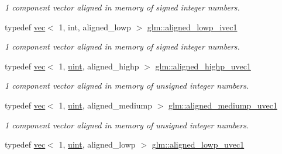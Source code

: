 \begin{DoxyCompactItemize}
\begin{DoxyCompactList}\small\item\em 1 component vector aligned in memory of signed integer numbers. \end{DoxyCompactList}\item 
\mbox{\label{group__gtc__type__aligned_gadf9e665b78c3aead513e9505fa31f9e2}} 
typedef \hyperlink{structglm_1_1vec}{vec}$<$ 1, int, aligned\+\_\+lowp $>$ \hyperlink{group__gtc__type__aligned_gadf9e665b78c3aead513e9505fa31f9e2}{glm\+::aligned\+\_\+lowp\+\_\+ivec1}
\begin{DoxyCompactList}\small\item\em 1 component vector aligned in memory of signed integer numbers. \end{DoxyCompactList}\item 
\mbox{\label{group__gtc__type__aligned_ga3ba8c6f6b81f57159b0536ce5d4339d0}} 
typedef \hyperlink{structglm_1_1vec}{vec}$<$ 1, \hyperlink{group__core__precision_ga4fd29415871152bfb5abd588334147c8}{uint}, aligned\+\_\+highp $>$ \hyperlink{group__gtc__type__aligned_ga3ba8c6f6b81f57159b0536ce5d4339d0}{glm\+::aligned\+\_\+highp\+\_\+uvec1}
\begin{DoxyCompactList}\small\item\em 1 component vector aligned in memory of unsigned integer numbers. \end{DoxyCompactList}\item 
\mbox{\label{group__gtc__type__aligned_ga7988ca1255907c807b71cb09a7cb590a}} 
typedef \hyperlink{structglm_1_1vec}{vec}$<$ 1, \hyperlink{group__core__precision_ga4fd29415871152bfb5abd588334147c8}{uint}, aligned\+\_\+mediump $>$ \hyperlink{group__gtc__type__aligned_ga7988ca1255907c807b71cb09a7cb590a}{glm\+::aligned\+\_\+mediump\+\_\+uvec1}
\begin{DoxyCompactList}\small\item\em 1 component vector aligned in memory of unsigned integer numbers. \end{DoxyCompactList}\item 
\mbox{\label{group__gtc__type__aligned_ga00df1f632a2e6c173796b5cede1be57c}} 
typedef \hyperlink{structglm_1_1vec}{vec}$<$ 1, \hyperlink{group__core__precision_ga4fd29415871152bfb5abd588334147c8}{uint}, aligned\+\_\+lowp $>$ \hyperlink{group__gtc__type__aligned_ga00df1f632a2e6c173796b5cede1be57c}{glm\+::aligned\+\_\+lowp\+\_\+uvec1}

\end{DoxyCompactItemize}
